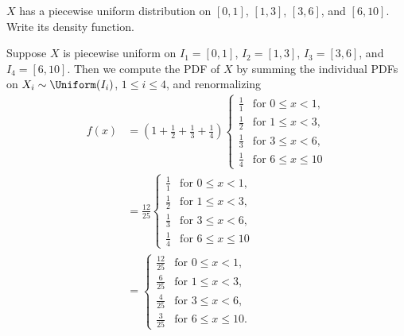 \begin{problem}[Handout 12, \# 13]
  \(X\) has a piecewise uniform distribution on \([0,1]\), \([1,3]\),
  \([3,6]\), and \([6,10]\). Write its density function.
\end{problem}
\begin{solution}
  Suppose \(X\) is piecewise uniform on \(I_1=[0,1]\), \(I_2=[1,3]\),
  \(I_3=[3,6]\), and \(I_4=[6,10]\). Then we compute the PDF of \(X\) by
  summing the individual PDFs on \(X_i\sim\Uniform(I_i)\), \(1\leq i\leq
  4\), and renormalizing
  \begin{align*}
    f(x)
    &=\left(1+\frac{1}{2}+\frac{1}{3}+\frac{1}{4}\right)
      \begin{cases}
      \frac{1}{1}&\text{for \(0\leq x<1\)},\\
      \frac{1}{2}&\text{for \(1\leq x<3\),}\\
      \frac{1}{3}&\text{for \(3\leq x<6\),}\\
      \frac{1}{4}&\text{for \(6\leq x\leq 10\)}
      \end{cases}\\
    &=\frac{12}{25}
      \begin{cases}
      \frac{1}{1}&\text{for \(0\leq x<1\)},\\
      \frac{1}{2}&\text{for \(1\leq x<3\),}\\
      \frac{1}{3}&\text{for \(3\leq x<6\),}\\
      \frac{1}{4}&\text{for \(6\leq x\leq 10\)}
      \end{cases}\\
    &=\begin{cases}
      \frac{12}{25}&\text{for \(0\leq x<1\)},\\
      \frac{6}{25}&\text{for \(1\leq x<3\),}\\
      \frac{4}{25}&\text{for \(3\leq x<6\),}\\
      \frac{3}{25}&\text{for \(6\leq x\leq 10\).}
      \end{cases}
  \end{align*}
\end{solution}
\newpage

